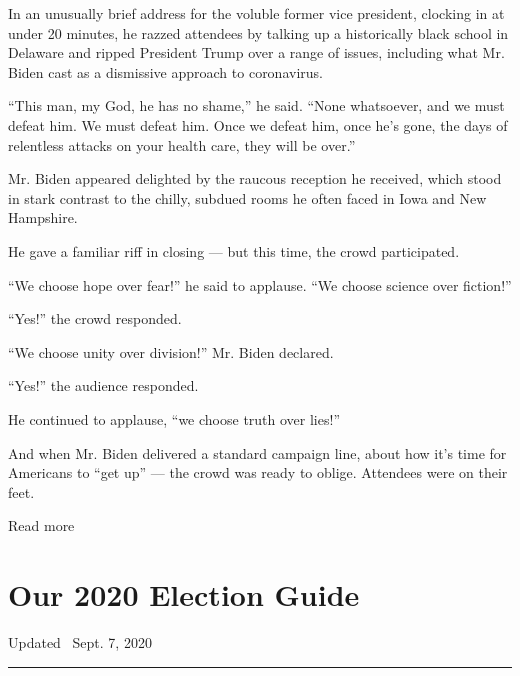 In an unusually brief address for the voluble former vice president,
clocking in at under 20 minutes, he razzed attendees by talking up a
historically black school in Delaware and ripped President Trump over a
range of issues, including what Mr. Biden cast as a dismissive approach
to coronavirus.

``This man, my God, he has no shame,'' he said. ``None whatsoever, and
we must defeat him. We must defeat him. Once we defeat him, once he's
gone, the days of relentless attacks on your health care, they will be
over.''

Mr. Biden appeared delighted by the raucous reception he received, which
stood in stark contrast to the chilly, subdued rooms he often faced in
Iowa and New Hampshire.

He gave a familiar riff in closing --- but this time, the crowd
participated.

``We choose hope over fear!'' he said to applause. ``We choose science
over fiction!''

``Yes!'' the crowd responded.

``We choose unity over division!'' Mr. Biden declared.

``Yes!'' the audience responded.

He continued to applause, ``we choose truth over lies!''

And when Mr. Biden delivered a standard campaign line, about how it's
time for Americans to ``get up'' --- the crowd was ready to oblige.
Attendees were on their feet.

Read more

\hypertarget{our-2020-election-guide}{%
\section{Our 2020 Election Guide}\label{our-2020-election-guide}}

Updated ~Sept. 7, 2020

\begin{center}\rule{0.5\linewidth}{\linethickness}\end{center}


